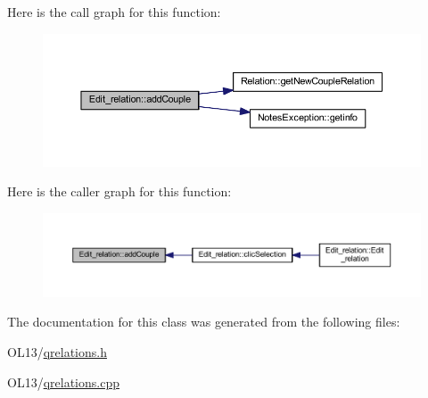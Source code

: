 Here is the call graph for this function\+:\nopagebreak
\begin{figure}[H]
\begin{center}
\leavevmode
\includegraphics[width=350pt]{class_edit__relation_a06254b8a5265ba82160c6ab62bbf9101_cgraph}
\end{center}
\end{figure}
Here is the caller graph for this function\+:\nopagebreak
\begin{figure}[H]
\begin{center}
\leavevmode
\includegraphics[width=350pt]{class_edit__relation_a06254b8a5265ba82160c6ab62bbf9101_icgraph}
\end{center}
\end{figure}


The documentation for this class was generated from the following files\+:\begin{DoxyCompactItemize}
\item 
O\+L13/\hyperlink{qrelations_8h}{qrelations.\+h}\item 
O\+L13/\hyperlink{qrelations_8cpp}{qrelations.\+cpp}\end{DoxyCompactItemize}
